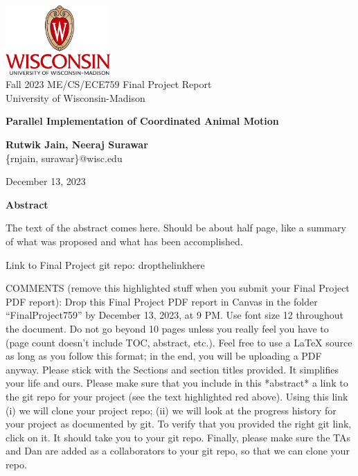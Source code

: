 \documentclass[12pt]{article}
\makeatletter
\theoremstyle{definition}
\renewenvironment{titlepage}
 {%
  \if@twocolumn
    \@restonecoltrue\onecolumn
  \else
    \@restonecolfalse\newpage
  \fi
  \thispagestyle{empty}%
 }
 {%
  \if@restonecol
    \twocolumn
  \else
    \newpage
  \fi
 }
\makeatother
\begin{document}
\begin{titlepage}
\thispagestyle{fancy}
   \begin{center}
       \vspace*{1cm}
       \includegraphics[width=4cm]{plots/color-center-UWlogo-print.png} \\
       Fall 2023 ME/CS/ECE759 Final Project Report\\
       University of Wisconsin-Madison

       \vspace*{4cm}

       {\Huge \textbf{Parallel Implementation of Coordinated Animal Motion}}
            
       \vspace{1.5cm}

       \textbf{Rutwik Jain, Neeraj Surawar}\\
       \{rnjain, surawar\}@wisc.edu

       \vfill
    
        
       {\Large December 13, 2023}
        \vspace{0.8cm}
            
   \end{center}
\end{titlepage}

\newpage
\begin{center}
    {\Large \textbf{Abstract}}

The text of the abstract comes here. Should be about half page, like a summary of what was proposed and what has been accomplished.

Link to Final Project git repo: dropthelinkhere



COMMENTS (remove this highlighted stuff when you submit your Final Project PDF report):
Drop this Final Project PDF report in Canvas in the folder “FinalProject759” by December 13,
2023, at 9 PM. Use font size 12 throughout the document. Do not go beyond 10 pages unless you really
feel you have to (page count doesn’t include TOC, abstract, etc.). Feel free to use a LaTeX source as
long as you follow this format; in the end, you will be uploading a PDF anyway.
Please stick with the Sections and section titles provided. It simplifies your life and ours.
Please make sure that you include in this *abstract* a link to the git repo for your project (see the text
highlighted red above). Using this link (i) we will clone your project repo; (ii) we will look at the
progress history for your project as documented by git.
To verify that you provided the right git link, click on it. It should take you to your git repo.
Finally, please make sure the TAs and Dan are added as a collaborators to your git repo, so that we can
clone your repo.

\end{center}
\end{document}

